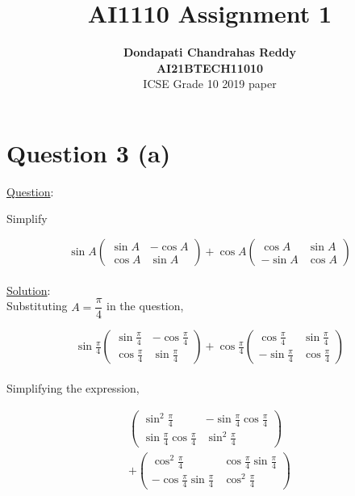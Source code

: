 \documentclass[journal,12pt,twocolumn]{IEEEtran}
\newcommand{\myvec}[1]{\ensuremath{\begin{pmatrix}#1\end{pmatrix}}}
\begin{document}
\title{\textbf{AI1110 Assignment 1} }
\author{\textbf{Dondapati Chandrahas Reddy}\\ \textbf{AI21BTECH11010}\\ ICSE Grade 10 2019 paper}

\maketitle

\section {Question 3 (a) \newline}

{\large \underline{Question}:\newline}

Simplify

\begin{equation}
	\sin A\myvec{\sin A &  -\cos A \\ \cos A & \sin A} + \cos A \myvec{\cos A &  \sin A \\ -\sin A & \cos A}
\end{equation}\\

{\large \underline{Solution}:}\\

Substituting $A = \dfrac{\pi}{4}$ in the question,

\begin{equation}
	\sin \tfrac{\pi}{4}\myvec{\sin \tfrac{\pi}{4} &  -\cos \tfrac{\pi}{4} \\[1ex] \cos \tfrac{\pi}{4} & \sin \tfrac{\pi}{4}} + \cos \tfrac{\pi}{4} \myvec{\cos \tfrac{\pi}{4} &  \sin \tfrac{\pi}{4} \\[1ex] -\sin \tfrac{\pi}{4} & \cos \tfrac{\pi}{4}}
\end{equation}\\

Simplifying the expression,

\begin{multline}
	\myvec{\sin^2 \tfrac{\pi}{4} &  -\sin \tfrac{\pi}{4}\cos \tfrac{\pi}{4} \\[1ex] \sin \tfrac{\pi}{4}\cos \tfrac{\pi}{4} & \sin^2 \tfrac{\pi}{4}} \\[1ex] 
	+ \myvec{\cos^2 \tfrac{\pi}{4} & \cos \tfrac{\pi}{4}\sin \tfrac{\pi}{4} \\[1ex] -\cos \tfrac{\pi}{4}\sin \tfrac{\pi}{4} & \cos^2 \tfrac{\pi}{4}}
\end{multline}\\
\end{document}
